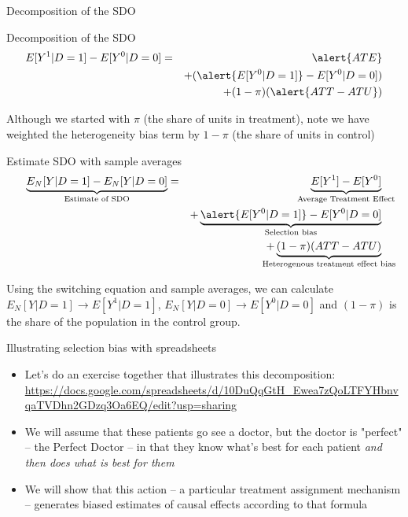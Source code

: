 \documentclass{beamer}
\begin{document}
\begin{frame}{Decomposition of the SDO}

  \begin{block}{Decomposition of the SDO}
    \begin{eqnarray*}
      E[Y^1 | D=1] - E[Y^0 | D=0]  &=& \alert{ATE} \\
      &&+ (\alert{E[Y^0|D=1]} - E[Y^0|D=0])  \\
      && + (1-\pi)(\alert{ATT - ATU})
    \end{eqnarray*}
  \end{block}
  
  \bigskip
  
Although we started with $\pi$ (the share of units in treatment), note we have weighted the heterogeneity bias term by $1-\pi$ (the share of units in control)
\end{frame}


\begin{frame}[plain]

  \begin{block}{Estimate SDO with sample averages}
    \begin{eqnarray*}
      \underbrace{E_N[Y | D=1] - E_N[Y | D=0]}_{ \mathclap{\text{Estimate of SDO}}}&=& \underbrace{E[Y^1] - E[Y^0]}_{ \mathclap{\text{Average Treatment Effect}}} \\
      &&+ \underbrace{\alert{E[Y^0|D=1]} - E[Y^0 | D=0]}_{ \mathclap{\text{Selection bias}}}  \\
      && + \underbrace{(1-\pi)(ATT - ATU)}_{ \mathclap{\text{Heterogenous treatment effect bias}}}
    \end{eqnarray*}
  \end{block}

\bigskip

Using the switching equation and sample averages, we can calculate $E_N[Y|D=1] \to E[Y^1 | D=1]$, $E_N[Y|D=0] \to E[Y^0|D=0]$ and $(1-\pi)$ is the share of the population in the control group.

\end{frame}

\begin{frame}{Illustrating selection bias with spreadsheets}
\begin{itemize}
\item Let's do an exercise together that illustrates this decomposition: \url{https://docs.google.com/spreadsheets/d/10DuQqGtH_Ewea7zQoLTFYHbnvqaTVDhn2GDzq3Oa6EQ/edit?usp=sharing}

\item We will assume that these patients go see a doctor, but the doctor is "perfect" -- the Perfect Doctor -- in that they know what's best for each patient \emph{and then does what is best for them}
\item We will show that this action -- a particular treatment assignment mechanism -- generates biased estimates of causal effects according to that formula
\end{itemize}
\end{frame}
\end{document}
